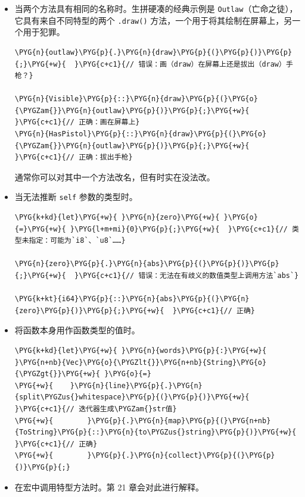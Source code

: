 \begin{itemize}
\item 当两个方法具有相同的名称时。生拼硬凑的经典示例是 \texttt{Outlaw}（亡命之徒），它具有来自不同特型的两个 \texttt{.draw()} 方法，一个用于将其绘制在屏幕上，另一个用于犯罪。

\begin{Verbatim}[commandchars=\\\{\},breaklines=true,breakanywhere=true,fontsize=\codefont,xleftmargin=17bp]
\PYG{n}{outlaw}\PYG{p}{.}\PYG{n}{draw}\PYG{p}{(}\PYG{p}{)}\PYG{p}{;}\PYG{+w}{  }\PYG{c+c1}{// 错误：画（draw）在屏幕上还是拔出（draw）手枪？}

\PYG{n}{Visible}\PYG{p}{::}\PYG{n}{draw}\PYG{p}{(}\PYG{o}{\PYGZam{}}\PYG{n}{outlaw}\PYG{p}{)}\PYG{p}{;}\PYG{+w}{  }\PYG{c+c1}{// 正确：画在屏幕上}
\PYG{n}{HasPistol}\PYG{p}{::}\PYG{n}{draw}\PYG{p}{(}\PYG{o}{\PYGZam{}}\PYG{n}{outlaw}\PYG{p}{)}\PYG{p}{;}\PYG{+w}{  }\PYG{c+c1}{// 正确：拔出手枪}
\end{Verbatim}

通常你可以对其中一个方法改名，但有时实在没法改。
\item 当无法推断 \texttt{self} 参数的类型时。

\begin{Verbatim}[commandchars=\\\{\},breaklines=true,breakanywhere=true,fontsize=\codefont,xleftmargin=17bp]
\PYG{k+kd}{let}\PYG{+w}{ }\PYG{n}{zero}\PYG{+w}{ }\PYG{o}{=}\PYG{+w}{ }\PYG{l+m+mi}{0}\PYG{p}{;}\PYG{+w}{  }\PYG{c+c1}{// 类型未指定：可能为`i8`、`u8`……}

\PYG{n}{zero}\PYG{p}{.}\PYG{n}{abs}\PYG{p}{(}\PYG{p}{)}\PYG{p}{;}\PYG{+w}{  }\PYG{c+c1}{// 错误：无法在有歧义的数值类型上调用方法`abs`}

\PYG{k+kt}{i64}\PYG{p}{::}\PYG{n}{abs}\PYG{p}{(}\PYG{n}{zero}\PYG{p}{)}\PYG{p}{;}\PYG{+w}{  }\PYG{c+c1}{// 正确}
\end{Verbatim}

\item 将函数本身用作函数类型的值时。

\begin{Verbatim}[commandchars=\\\{\},breaklines=true,breakanywhere=true,fontsize=\codefont,xleftmargin=17bp]
\PYG{k+kd}{let}\PYG{+w}{ }\PYG{n}{words}\PYG{p}{:}\PYG{+w}{ }\PYG{n+nb}{Vec}\PYG{o}{\PYGZlt{}}\PYG{n+nb}{String}\PYG{o}{\PYGZgt{}}\PYG{+w}{ }\PYG{o}{=}
\PYG{+w}{    }\PYG{n}{line}\PYG{p}{.}\PYG{n}{split\PYGZus{}whitespace}\PYG{p}{(}\PYG{p}{)}\PYG{+w}{  }\PYG{c+c1}{// 迭代器生成\PYGZam{}str值}
\PYG{+w}{        }\PYG{p}{.}\PYG{n}{map}\PYG{p}{(}\PYG{n+nb}{ToString}\PYG{p}{::}\PYG{n}{to\PYGZus{}string}\PYG{p}{)}\PYG{+w}{  }\PYG{c+c1}{// 正确}
\PYG{+w}{        }\PYG{p}{.}\PYG{n}{collect}\PYG{p}{(}\PYG{p}{)}\PYG{p}{;}
\end{Verbatim}

\item 在宏中调用特型方法时。第 21 章会对此进行解释。
\end{itemize}

